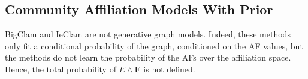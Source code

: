 \documentclass[letterpaper]{article} %
\newtheorem{definition}[theorem]{Definition}
\begin{document}




\subsection{Community Affiliation Models With Prior}

BigClam and IeClam are not  generative graph models. Indeed, these methods only fit a conditional probability of the graph, conditioned on the AF values, but the methods do not learn the probability of the AFs over the affiliation space. Hence, the total probability of $E\wedge\mathbf{F}$ is not defined. %
%
\end{document}
